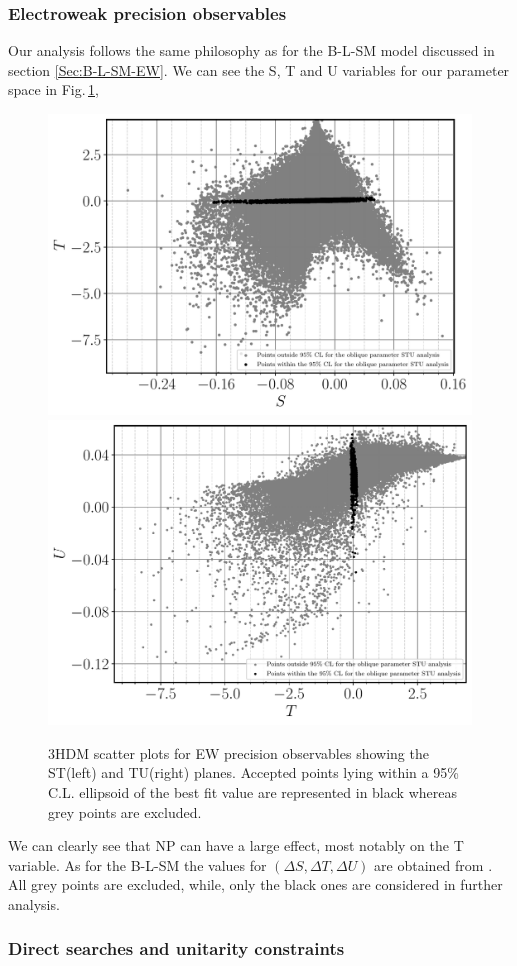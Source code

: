 \documentclass[10pt]{report}
\begin{document}
\subsubsection{Electroweak precision observables}
%
Our analysis follows the same philosophy as for the B-L-SM model discussed in section \ref{Sec:B-L-SM-EW}.
%
We can see the S, T and U variables for our parameter space in Fig.\,\ref{Fig:3HDM_STU}, 
%
\begin{figure}[H]
	\centering
	\includegraphics[width=.49\textwidth]{Images/3HDM/EW/EW_S_T_black.pdf}	
	\includegraphics[width=.49\textwidth]{Images/3HDM/EW/EW_T_U_black.pdf}
	\caption{3HDM scatter plots for EW  precision  observables  showing  the ST(left)  and TU(right) planes.  Accepted points lying within a 95\% C.L. ellipsoid of the best fit value are represented in black whereas grey points are excluded.}
	\label{Fig:3HDM_STU}
\end{figure}
%
We can clearly see that NP can have a large effect, most notably on the T variable.
%
As for the B-L-SM the values for $(\Delta S , \Delta T , \Delta U )$ are obtained from \cite{Baak_2012}. All grey points are excluded, while, only the black ones are considered in further analysis.
%
\subsubsection{Direct searches and unitarity constraints}
\end{document}
